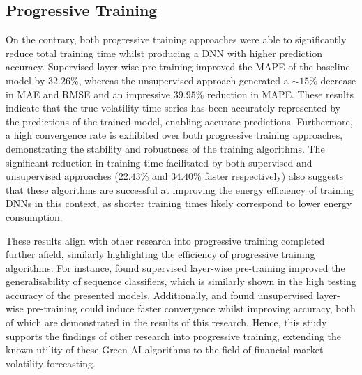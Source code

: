 \documentclass[a4paper, 11pt]{report}
\begin{document}
    \subsection{Progressive Training}

    On the contrary, both progressive training approaches were able to significantly reduce total training time whilst producing a DNN with higher prediction accuracy. Supervised layer-wise pre-training improved the MAPE of the baseline model by $32.26\%$, whereas the unsupervised approach generated a $\sim \! 15\%$ decrease in MAE and RMSE and an impressive $39.95\%$ reduction in MAPE. These results indicate that the true volatility time series has been accurately represented by the predictions of the trained model, enabling accurate predictions. Furthermore, a high convergence rate is exhibited over both progressive training approaches, demonstrating the stability and robustness of the training algorithms. The significant reduction in training time facilitated by both supervised and unsupervised approaches ($22.43\%$ and $34.40\%$ faster respectively) also suggests that these algorithms are successful at improving the energy efficiency of training DNNs in this context, as shorter training times likely correspond to lower energy consumption.

    These results align with other research into progressive training completed further afield, similarly highlighting the efficiency of progressive training algorithms. For instance, \citet{ienco-2019} found supervised layer-wise pre-training improved the generalisability of sequence classifiers, which is similarly shown in the high testing accuracy of the presented models. Additionally, \citet{xu-2018} and \citet{sagheer-2019} found unsupervised layer-wise pre-training could induce faster convergence whilst improving accuracy, both of which are demonstrated in the results of this research. Hence, this study supports the findings of other research into progressive training, extending the known utility of these Green AI algorithms to the field of financial market volatility forecasting.
\end{document}
